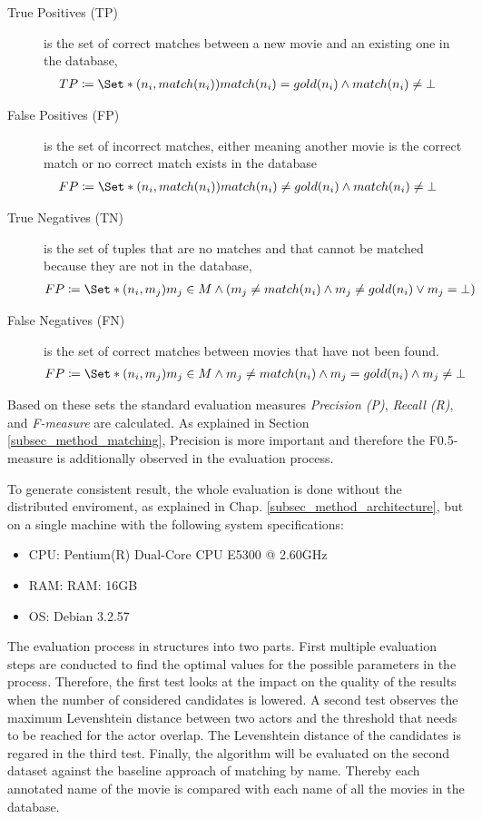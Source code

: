 \begin{description}
\item[True Positives (TP)] is the set of correct matches between a new movie and an existing one in the database,
\begin{align}
TP &\coloneqq \Set*{(n_i, match(n_i))}{match(n_i) = gold(n_i) \land match(n_i) \neq \bot}
\end{align}
\item[False Positives (FP)] is the set of incorrect matches, either meaning another movie is the correct match or no correct match exists in the database
\begin{align}
FP &\coloneqq \Set*{(n_i, match(n_i))}{match(n_i) \neq gold(n_i) \land match(n_i) \neq \bot}
\end{align}\item[True Negatives (TN)] is the set of tuples that are no matches and that cannot be matched because they are not in the database,
\begin{align}
FP &\coloneqq \Set*{(n_i, m_j)}{m_j \in M \land (m_j \neq match(n_i) \land m_j \neq gold(n_i) \lor m_j = \bot)}
\end{align}
\item[False Negatives (FN)] is the set of correct matches between movies that have not been found.
\begin{align}
FP &\coloneqq \Set*{(n_i, m_j)}{m_j \in M \land m_j \neq match(n_i) \land m_j = gold(n_i) \land m_j \neq \bot}
\end{align}
\end{description}

Based on these sets the standard evaluation measures \emph{Precision (P)}, \emph{Recall (R)}, and \emph{F-measure} are calculated.
As explained in Section \ref{subsec_method_matching}, Precision is more important and therefore the F0.5-measure is additionally observed in the evaluation process.

To generate consistent result, the whole evaluation is done without the distributed enviroment, as explained in Chap. \ref{subsec_method_architecture}, but on a single machine with the following system specifications:
\begin{itemize}
\item CPU: Pentium(R) Dual-Core  CPU E5300  @ 2.60GHz
\item RAM: RAM: 16GB
\item OS: Debian 3.2.57
\end{itemize}

The evaluation process in structures into two parts. First multiple evaluation steps are conducted to find the optimal values for the possible parameters in the process. Therefore, the first test looks at the impact on the quality of the results when the number of considered candidates is lowered. A second test observes the maximum Levenshtein distance between two actors and the threshold that needs to be reached for the actor overlap. The Levenshtein distance of the candidates is regared in the third test. Finally, the algorithm will be evaluated on the second dataset against the baseline approach of matching by name. Thereby each annotated name of the movie is compared with each name of all the movies in the database.

